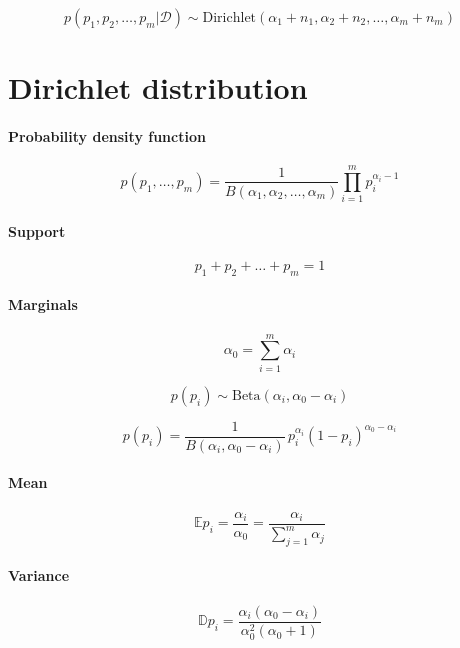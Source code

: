 \documentclass{article}
\newcommand{\expect}[1]{
	\mathbb{E} #1
}
\begin{document}
\begin{equation*}
p(p_1, p_2, \ldots, p_m|\mathcal{D}) \sim \textrm{Dirichlet}(\alpha_1 + n_1, \alpha_2 + n_2, \ldots, \alpha_m + n_m)
\end{equation*}

\section{Dirichlet distribution}

\paragraph{Probability density function}
\begin{equation}
p(p_1, \ldots, p_m) = \frac{1}{B(\alpha_1, \alpha_2, \ldots, \alpha_m)} \prod_{i=1}^m{p_i^{\alpha_i - 1}}
\end{equation}

\paragraph{Support}
\begin{equation}
p_1 + p_2 + \ldots + p_m = 1
\end{equation}

\paragraph{Marginals}
\begin{equation*}
\alpha_0 = \sum_{i=1}^m{\alpha_i}
\end{equation*}

\begin{equation*}
p(p_i) \sim \textrm{Beta}(\alpha_i, \alpha_0 - \alpha_i)
\end{equation*}

\begin{equation}
p(p_i) = \frac{1}{B(\alpha_i, \alpha_0 - \alpha_i)} \, p_i^{\alpha_i} (1 - p_i)^{\alpha_0 - \alpha_i}
\end{equation}

\paragraph{Mean}
\begin{equation}
\expect{p_i} = \frac{\alpha_i}{\alpha_0} = \frac{\alpha_i}{\sum\limits_{j=1}^m{\alpha_j}}
\end{equation}

\paragraph{Variance}
\begin{equation}
\mathbb{D}{p_i} = \frac{\alpha_i(\alpha_0 - \alpha_i)}{\alpha_0^2(\alpha_0 + 1)}
\end{equation}
\end{document}
